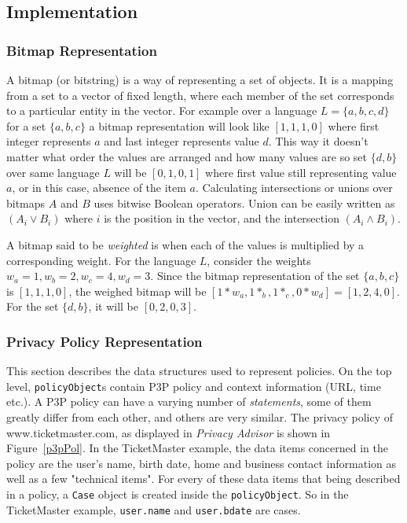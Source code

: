 \subsection{Implementation}

\subsubsection{Bitmap Representation}
A bitmap (or bitstring) is a way of representing a set of objects. It is a mapping from a set to a vector of fixed length, where each member of the set corresponds to a particular entity in the vector. For example over a language $L=\{a,b,c,d\}$ for a set $\{a,b,c\}$ a bitmap representation will look like $[1, 1, 1, 0]$ where first integer represents $a$ and last integer represents value $d$. This way it doesn't matter what order the values are arranged and how many values are so set $\{d,b\}$ over same language $L$ will be $[0, 1, 0, 1]$ where first value still representing value $a$, or in this case, absence of the item $a$. Calculating intersections or unions over bitmaps $A$ and $B$ uses bitwise Boolean operators. Union can be easily written as $(A_i \vee B_i)$ where $i$ is the position in the vector, and the intersection $(A_i \wedge B_i)$.

A bitmap said to be \emph{weighted} is when each of the values is multiplied by a corresponding weight. For the language $L$, consider the weights $w_a=1, w_b=2, w_c=4, w_d=3$. Since the bitmap representation of the set $\{a,b,c\}$ is $[1, 1, 1, 0]$, the weighed bitmap will be $[1*w_a, 1*_b, 1*_c, 0*w_d]=[1, 2, 4, 0]$. For the set $\{d,b\}$, it will be $[0, 2, 0, 3]$.


\subsubsection{Privacy Policy Representation}\label{privPolRep}

This section describes the data structures used to represent policies. On the top level, \texttt{policyObject}s contain P3P policy and context information (URL, time etc.). A P3P policy can have a varying number of \emph{statements}, some of them greatly differ from each other, and others are very similar. The privacy policy of www.ticketmaster.com, as displayed in \emph{Privacy Advisor} is shown in Figure~\ref{p3pPol}. In the TicketMaster example, the data items concerned in the policy are the user's name, birth date, home and business contact information as well as a few "technical items". For every of these data items that being described in a policy,  a \texttt{Case} object is created inside the \texttt{policyObject}. So in the TicketMaster example, \texttt{user.name} and \texttt{user.bdate} are cases.

